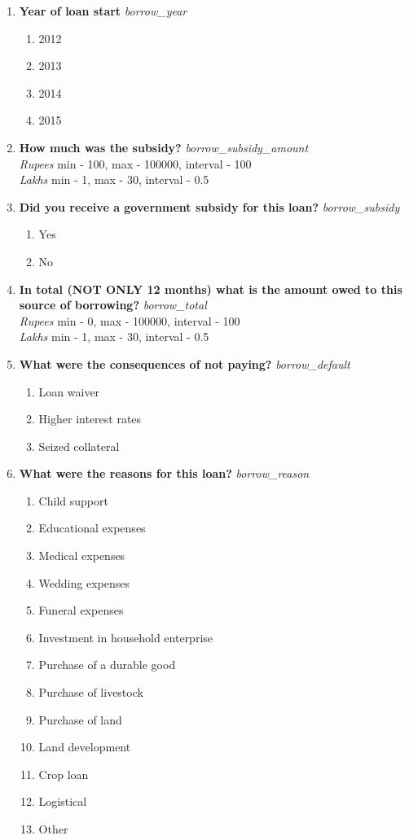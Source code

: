\documentclass{article}
\begin{document}
\begin{enumerate}
\begin{enumerate}[label*=\arabic*.]
\item {\bfseries Year of loan start}\emph{ borrow\_year } 
\begin{enumerate} 
\item 2012 
\item 2013 
\item 2014 
\item 2015 
\end{enumerate} 

\item {\bfseries How much was the subsidy?}\emph{ borrow\_subsidy\_amount } 
\\ \emph{ Rupees }min - 100, max - 100000, interval - 100 
\\ \emph{ Lakhs }min - 1, max - 30, interval - 0.5 
 

\item {\bfseries Did you receive a government subsidy for this loan?}\emph{ borrow\_subsidy } 
\begin{enumerate} 
\item Yes 
\item No 
\end{enumerate} 

\item {\bfseries In total (NOT ONLY 12 months) what is the amount owed to this source of borrowing?}\emph{ borrow\_total } 
\\ \emph{ Rupees }min - 0, max - 100000, interval - 100 
\\ \emph{ Lakhs }min - 1, max - 30, interval - 0.5 
 
\item {\bfseries What were the consequences of not paying?}\emph{ borrow\_default } 
\begin{enumerate} 
\item Loan waiver 
\item Higher interest rates 
\item Seized collateral 
\end{enumerate} 

\item {\bfseries What were the reasons for this loan?}\emph{ borrow\_reason } 
\begin{enumerate} 
\item Child support 
\item Educational expenses 
\item Medical expenses 
\item Wedding expenses 
\item Funeral expenses 
\item Investment in household enterprise 
\item Purchase of a durable good 
\item Purchase of livestock 
\item Purchase of land 
\item Land development 
\item Crop loan 
\item Logistical 
\item Other 
\end{enumerate} 

\end{enumerate} 
\end{enumerate}
\end{document}
